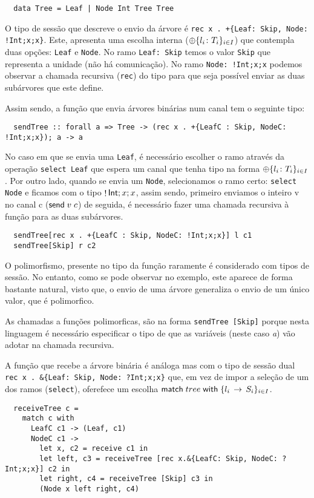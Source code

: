 \begin{lstlisting}
  data Tree = Leaf | Node Int Tree Tree
\end{lstlisting}

O tipo de sessão que descreve o envio da árvore é \lstinline"rec x . +{Leaf: Skip, Node: !Int;x;x}". Este, apresenta uma escolha interna ($\oplus\{l_i\colon T_i\}_{i\in I}$) que contempla duas opções: \lstinline"Leaf" e \lstinline"Node". No ramo \lstinline"Leaf: Skip" temos o valor \lstinline"Skip" que representa a unidade (não há comunicação). No ramo \lstinline"Node: !Int;x;x" podemos observar a chamada recursiva (\lstinline"rec") do tipo para que seja possível enviar as duas subárvores que este define.

Assim sendo, a função que envia árvores binárias num canal tem o seguinte tipo:

\begin{lstlisting}
  sendTree :: forall a => Tree -> (rec x . +{LeafC : Skip, NodeC: !Int;x;x}); a -> a
\end{lstlisting}


No caso em que se envia uma \lstinline"Leaf", é necessário escolher o ramo através da operação \lstinline"select Leaf" que espera um canal que tenha tipo na forma $\oplus\{l_i\colon T_i\}_{i\in I}$.
Por outro lado, quando se envia um \lstinline"Node", selecionamos o ramo certo: \lstinline"select Node" e ficamos com o tipo $\mathop!\mathsf{Int};x;x$, assim sendo, primeiro enviamos o inteiro v no canal c ($\mathsf{send}\;v\; c$) de seguida, é necessário fazer uma chamada recursiva à função para as duas subárvores.

\begin{lstlisting}
  sendTree[rec x . +{LeafC : Skip, NodeC: !Int;x;x}] l c1
  sendTree[Skip] r c2
\end{lstlisting}

O polimorfismo, presente no tipo da função raramente é considerado com tipos de sessão. No entanto, como se pode observar no exemplo, este aparece de forma bastante natural, visto que, o envio de uma árvore generaliza o envio de um único valor, que é polimorfico.

As chamadas a funções polimorficas, são na forma \lstinline"sendTree [Skip]" porque nesta linguagem é necessário especificar o tipo de que as variáveis (neste caso \textit{a}) vão adotar na chamada recursiva.

A função que recebe a árvore binária é análoga mas com o tipo de sessão dual \lstinline"rec x . &{Leaf: Skip, Node: ?Int;x;x}" que, em vez de impor a seleção de um dos ramos (\lstinline"select"), oferefece um escolha $\mathsf{match}\;tree\;\mathsf{with}\;\{l_i\,\to\,S_i\}_{i\in I}$.
\begin{lstlisting}  
  receiveTree c =
    match c with
      LeafC c1 -> (Leaf, c1)
      NodeC c1 ->
        let x, c2 = receive c1 in
        let left, c3 = receiveTree [rec x.&{LeafC: Skip, NodeC: ?Int;x;x}] c2 in
        let right, c4 = receiveTree [Skip] c3 in
        (Node x left right, c4)
\end{lstlisting}


